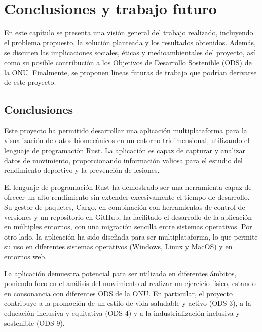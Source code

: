 \chapter{Conclusiones y trabajo futuro} \label{sec:cap6}

\noindent En este capítulo se presenta una visión general del trabajo realizado, incluyendo el problema propuesto, la solución planteada y los resultados obtenidos. Además, se discuten las implicaciones sociales, éticas y medioambientales del proyecto, así como su posible contribución a los Objetivos de Desarrollo Sostenible (ODS) de la ONU. Finalmente, se proponen líneas futuras de trabajo que podrían derivarse de este proyecto.

\section{Conclusiones}

Este proyecto ha permitido desarrollar una aplicación multiplataforma para la visualización de datos biomecánicos en un entorno tridimensional, utilizando el lenguaje de programación Rust. La aplicación es capaz de capturar y analizar datos de movimiento, proporcionando información valiosa para el estudio del rendimiento deportivo y la prevención de lesiones.

El lenguaje de programación Rust ha demostrado ser una herramienta capaz de ofrecer un alto rendimiento sin extender excesivamente el tiempo de desarrollo. Su gestor de paquetes, Cargo, en combinación con herramientas de control de versiones y un repositorio en GitHub, ha facilitado el desarrollo de la aplicación en múltiples entornos, con una migración sencilla entre sistemas operativos. Por otro lado, la aplicación ha sido diseñada para ser multiplataforma, lo que permite su uso en diferentes sistemas operativos (Windows, Linux y MacOS) y en entornos web.

La aplicación demuestra potencial para ser utilizada en diferentes ámbitos, poniendo foco en el análisis del movimiento al realizar un ejercicio físico, estando en consonancia con diferentes ODS de la ONU. En particular, el proyecto contribuye a la promoción de un estilo de vida saludable y activo (ODS 3), a la educación inclusiva y equitativa (ODS 4) y a la industrialización inclusiva y sostenible (ODS 9).

